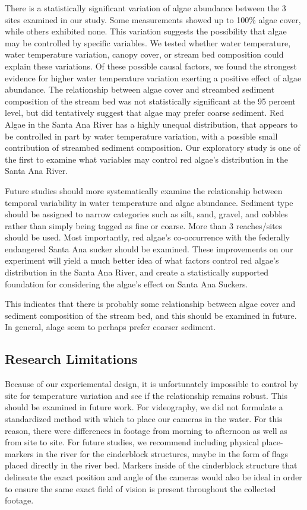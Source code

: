 \documentclass{article}
\begin{document}
There is a statistically significant variation of algae abundance between the 3 sites examined in our study. Some measurements showed up to 100\% algae cover, while others exhibited none. This variation suggests the possibility that algae may be controlled by specific variables. We tested whether water temperature, water temperature variation, canopy cover, or stream bed composition could explain these variations. Of these possible causal factors, we found the strongest evidence for higher water temperature variation exerting a positive effect of algae abundance. The relationship between algae cover and streambed sediment composition of the stream bed was not statistically significant at the 95 percent level, but did tentatively suggest that algae may prefer coarse sediment. Red Algae in the Santa Ana River has a highly unequal distribution, that appears to be controlled in part by water temperature variation, with a possible small contribution of streambed sediment composition. 
Our exploratory study is one of the first to examine what variables may control red algae's distribution in the Santa Ana River. 

Future studies should more systematically examine the relationship between temporal variability in water temperature and algae abundance. Sediment type should be assigned to narrow categories such as silt, sand, gravel, and cobbles rather than simply being tagged as fine or coarse. More than 3 reaches/sites should be used. Most importantly, red algae's co-occurrence with the federally endangered Santa Ana sucker should be examined. These improvements on our experiment will yield a much better idea of what factors control red algae's distribution in the Santa Ana River, and create a statistically supported foundation for considering the algae's effect on Santa Ana Suckers.

This indicates that there is probably some relationship between algae cover and sediment composition of the stream bed, and this should be examined in future. In general, alage seem to perhaps prefer coarser sediment. 

\subsection{Research Limitations}
Because of our experiemental design, it is unfortunately impossible to control by site for temperature variation and see if the relationship remains robust. This should be examined in future work. For videography, we did not formulate a standardized method with which to place our cameras in the water. For this reason, there were differences in footage from morning to afternoon as well as from site to site. For future studies, we recommend including physical place-markers in the river for the cinderblock structures, maybe in the form of flags placed directly in the river bed. Markers inside of the cinderblock structure that delineate the exact position and angle of the cameras would also be ideal in order to ensure the same exact field of vision is present throughout the collected footage. 
\end{document}
